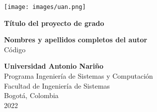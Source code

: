 \begin{titlepage}
    \begin{center}
        \texttt{[image: images/uan.png]}\\
        \vspace*{1cm}

        \Huge
        \textbf{Título del proyecto de grado}
 
        \vspace{2cm}
        
        \large
        \textbf{Nombres y apellidos completos del autor}\\
        Código
 
        \vfill
             
        \vspace{0.8cm}
             
        \textbf{Universidad Antonio Nariño}\\
        Programa Ingeniería de Sistemas y Computación\\
        Facultad de Ingeniería de Sistemas\\
        Bogotá, Colombia\\
        2022
    \end{center}
\end{titlepage}

